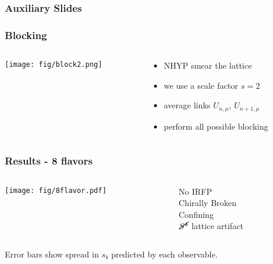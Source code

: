 
\begin{frame}
  \addtocounter{framenumber}{-1}
  \frametitle{Auxiliary Slides}
\end{frame}

\begin{frame}
  \addtocounter{framenumber}{-1}
  \frametitle{Blocking}
  \begin{columns}[T]
    \begin{column}{.5\textwidth}
      \begin{block}{}
        \texttt{[image: fig/block2.png]}
      \end{block}
    \end{column}
    \begin{column}{.5\textwidth}
      \begin{block}{}
        \begin{itemize}
          \item NHYP smear the lattice
          \item we use a scale factor $s=2$
          \item average links $U_{n,\mu}$, $U_{n+1,\mu}$
          \item perform all possible blocking
        \end{itemize}
      \end{block}
    \end{column}
  \end{columns}
\end{frame}

\begin{frame}
  \addtocounter{framenumber}{-1}
  \frametitle{Results - 8 flavors}
  \begin{columns}[T]
    \begin{column}{.6\textwidth}
      \texttt{[image: fig/8flavor.pdf]}
    \end{column}
    \begin{column}{.4\textwidth}
      No IRFP\\
      Chirally Broken\\
      Confining\\
      \vspace{48pt}
      $\ensuremath{\cancel{S^4}}$ lattice artifact
    \end{column}
  \end{columns}
  \vspace{12pt}
  Error bars show spread in $s_b$ predicted by each observable.
\end{frame}

